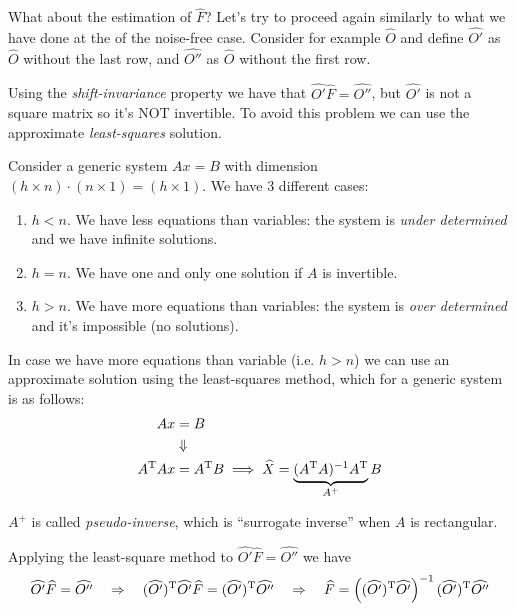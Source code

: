 What about the estimation of $\hat{F}$? Let's try to proceed again similarly to what we have done at the  of the noise-free case.
Consider for example $\hat{O}$ and define $\hat{O'}$ as $\hat{O}$ without the last row, and $\hat{O''}$ as $\hat{O}$ without the first row.

Using the \emph{shift-invariance} property we have that $\hat{O'} \hat{F} = \hat{O''}$, but $\hat{O'}$ is not a square matrix so it's NOT invertible.
To avoid this problem we can use the approximate \emph{least-squares} solution.


\begin{recall}
    Consider a generic system $Ax = B$ with dimension  $(h\times n) \cdot (n \times 1) = (h \times 1)$. We have 3 different cases:
    \begin{enumerate}
        \item $h < n$. We have less equations than variables: the system is \emph{under determined} and we have infinite solutions.
        \item $h = n$. We have one and only one solution if $A$ is invertible.
        \item $h > n$. We have more equations than variables: the system is \emph{over determined} and it's impossible (no solutions).
    \end{enumerate}
\end{recall}

\begin{remark}
    In case we have more equations than variable (i.e. $h>n$) we can use an approximate solution using the least-squares method, which for a generic system is as follows:
    \begin{align*}
        Ax &= B \\
           &\Downarrow\\
        A^{\mathrm{T}} A x &= A^{\mathrm{T}} B \implies \widehat{X} = \underbrace{(A^{\mathrm{T}} A)^{-1}A^{\mathrm{T}}}_{A^+} B
    \end{align*}
    
    $A^+$ is called \emph{pseudo-inverse}, which is ``surrogate inverse'' when $A$ is rectangular.
\end{remark}


Applying the least-square method to $\hat{O'} \hat{F} = \hat{O''}$ we have
\begin{align*}
    \widehat{O'}\widehat{F} = \widehat{O''} \quad \Rightarrow \quad
    (\widehat{O'})^{\mathrm{T}}\widehat{O'}\widehat{F} = (\widehat{O'})^{\mathrm{T}}\widehat{O''} \quad \Rightarrow \quad 
    \widehat{F} = \left((\widehat{O'})^{\mathrm{T}}\widehat{O'}\right)^{-1} (\widehat{O'})^{\mathrm{T}}\widehat{O''}
\end{align*}


